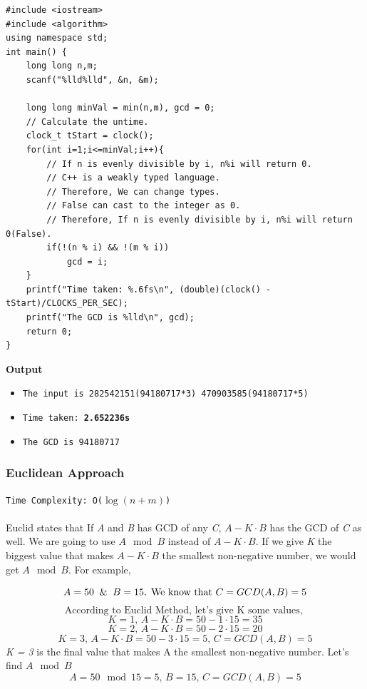 \documentclass[12pt]{article}
\begin{document}
\begin{verbatim}
#include <iostream>
#include <algorithm>
using namespace std;
int main() {
    long long n,m;
    scanf("%lld%lld", &n, &m);

    long long minVal = min(n,m), gcd = 0;
    // Calculate the untime.
    clock_t tStart = clock();
    for(int i=1;i<=minVal;i++){
        // If n is evenly divisible by i, n%i will return 0.
        // C++ is a weakly typed language.
        // Therefore, We can change types.
        // False can cast to the integer as 0.
        // Therefore, If n is evenly divisible by i, n%i will return 0(False).
        if(!(n % i) && !(m % i))
            gcd = i;
    }
    printf("Time taken: %.6fs\n", (double)(clock() - tStart)/CLOCKS_PER_SEC);
    printf("The GCD is %lld\n", gcd);
    return 0;
}
\end{verbatim}
\textbf{Output}

\begin{itemize}
  \item \texttt{The input is 282542151(94180717*3) 470903585(94180717*5) } 
  \item \texttt{Time taken: \textbf{2.652236s}} 
  \item \texttt{The GCD is 94180717}
\end{itemize}

\subsubsection{Euclidean Approach}
\texttt{Time Complexity:  O($\log{(n+m)}$) } \\ \\
Euclid states that If \textit{A} and \textit{B} has GCD of any \textit{C}, \texttt{$A-K \cdot B$} has the GCD of \textit{C} as well. We are going to use \texttt{$A \mod B$} instead of \texttt{$A-K \cdot B$}. If we give \textit{K} the biggest value that makes \texttt{$A-K \cdot B$} the smallest non-negative number, we would get \textit{$A \mod B$}. For example,

\[ A = 50 \And B = 15  \text{.     We know that  } C = GCD(A,B) = 5 \]
\[ \text{According to Euclid Method, let's give K some values, } \]
\[ K = 1 \text{, } \texttt{$A-K \cdot B$} = 50 - 1 \cdot 15  = 35  \]
\[ K = 2 \text{, } \texttt{$A-K \cdot B$} = 50 - 2 \cdot 15  = 20  \]
\[ K = 3 \text{, } \texttt{$A-K \cdot B$} = 50 - 3 \cdot 15  = 5 \text{, } C = GCD(A,B) = 5 \]
\textit{K = 3} is the final value that makes A the smallest non-negative number. Let's find $A \mod B$
\[ A = 50 \mod{15} = 5 \text{, } B = 15 \text{, } C = GCD(A,B) = 5 \]
\end{document}
